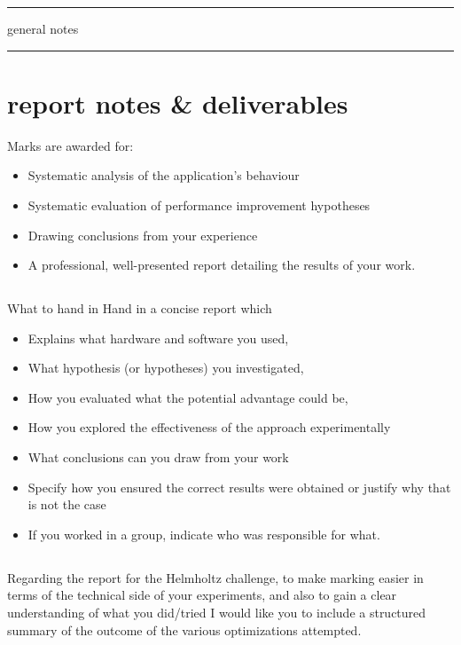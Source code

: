 \documentclass[11pt, oneside, a4paper]{article}
\begin{document}
\hspace{1em}
\hrule
general notes
\hspace{1em}
\hrule

\section{report notes \& deliverables} %
\label{sec:report_notes_on_deliverables}

Marks are awarded for:
\begin{itemize}
\item  Systematic analysis of the application's behaviour
\item  Systematic evaluation of performance improvement hypotheses
\item  Drawing conclusions from your experience
\item  A professional, well-presented report detailing the results of your work.
\end{itemize}

\subsection{} %
\label{sub:}


What to hand in Hand in a concise report which
\begin{itemize}
\item  Explains what hardware and software you used,
\item  What hypothesis (or hypotheses) you investigated,
\item  How you evaluated what the potential advantage could be,
\item  How you explored the effectiveness of the approach experimentally
\item  What conclusions can you draw from your work
\item  Specify how you ensured the correct results were obtained or justify why that is not the case
\item  If you worked in a group, indicate who was responsible for what.
\end{itemize}

\subsection{} %
\label{sub:}


Regarding the report for the Helmholtz challenge, to make marking easier in terms of the technical side of your experiments, and also to gain a clear understanding of what you did/tried I would like you to include a structured summary of the outcome of the various optimizations attempted.
\end{document}
